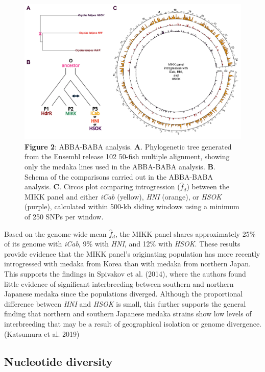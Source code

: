 \documentclass[
]{book}
\begin{document}
\begin{figure}
\includegraphics[width=1\linewidth]{figs/mikk_genome/07_introgression} \caption{\textbf{Figure 2}: ABBA-BABA analysis. \textbf{A}. Phylogenetic tree generated from the Ensembl release 102 50-fish multiple alignment, showing only the medaka lines used in the ABBA-BABA analysis. \textbf{B}. Schema of the comparisons carried out in the ABBA-BABA analysis. \textbf{C}. Circos plot comparing introgression (\(\hat{f}_d\)) between the MIKK panel and either \emph{iCab} (yellow), \emph{HNI} (orange), or \emph{HSOK} (purple), calculated within 500-kb sliding windows using a minimum of 250 SNPs per window.}\label{fig:ABBABABA}
\end{figure}

Based on the genome-wide mean \(\hat{f}_d\), the MIKK panel shares approximately 25\% of its genome with \emph{iCab}, 9\% with \emph{HNI}, and 12\% with \emph{HSOK}. These results provide evidence that the MIKK panel's originating population has more recently introgressed with medaka from Korea than with medaka from northern Japan. This supports the findings in Spivakov et al. (2014), where the authors found little evidence of significant interbreeding between southern and northern Japanese medaka since the populations diverged. Although the proportional difference between \emph{HNI} and \emph{HSOK} is small, this further supports the general finding that northern and southern Japanese medaka strains show low levels of interbreeding that may be a result of geographical isolation or genome divergence.(Katsumura et al. 2019)

\hypertarget{nuc-div}{%
\subsection{Nucleotide diversity}\label{nuc-div}}
\end{document}
